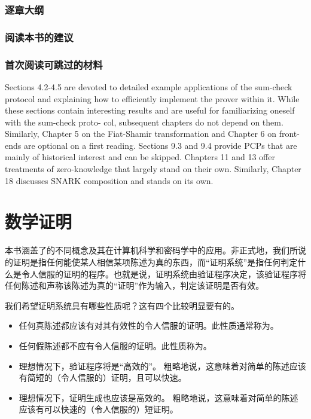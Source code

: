 \subsubsection{逐章大纲}
\subsubsection{阅读本书的建议}



\subsubsection{首次阅读可跳过的材料} Sections 4.2-4.5 are devoted to detailed example applications of the sum-check protocol and explaining how to efficiently implement the prover within it. While these sections contain interesting results and are useful for familiarizing oneself with the sum-check proto- col, subsequent chapters do not depend on them. Similarly, Chapter 5 on the Fiat-Shamir transformation and Chapter 6 on front-ends are optional on a first reading. Sections 9.3 and 9.4 provide PCPs that are mainly of historical interest and can be skipped.
Chapters 11 and 13 offer treatments of zero-knowledge that largely stand on their own. Similarly, Chapter 18 discusses SNARK composition and stands on its own.



\section{数学证明}
本书涵盖了的不同概念及其在计算机科学和密码学中的应用。非正式地，我们所说的证明是指任何能使某人相信某项陈述为真的东西，而“证明系统”是指任何判定什么是令人信服的证明的程序。也就是说，证明系统由验证程序决定，该验证程序将任何陈述和声称该陈述为真的“证明”作为输入，判定该证明是否有效。

我们希望证明系统具有哪些性质呢？这有四个比较明显要有的。
\begin{itemize}
    \item 任何真陈述都应该有对其有效性的令人信服的证明。此性质通常称为。
    \item 任何假陈述都不应有令人信服的证明。此性质称为。
    \item 理想情况下，验证程序将是“高效的”。 粗略地说，这意味着对简单的陈述应该有简短的（令人信服的）证明，且可以快速。
    \item 理想情况下，证明生成也应该是高效的。 粗略地说，这意味着对简单的陈述应该有可以快速的（令人信服的）短证明。
\end{itemize}


